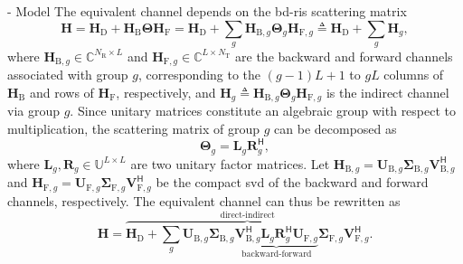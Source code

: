 \documentclass[journal]{IEEEtran}
\begin{document}
\begin{section}{- Model}
	The equivalent channel depends on the \gls{bd}-\gls{ris} scattering matrix
	\begin{equation}
		\mathbf{H} = \mathbf{H}_\mathrm{D} + \mathbf{H}_\mathrm{B} \mathbf{\Theta} \mathbf{H}_\mathrm{F} = \mathbf{H}_\mathrm{D} + \sum_g \mathbf{H}_{\mathrm{B},g} \mathbf{\Theta}_g \mathbf{H}_{\mathrm{F},g} \triangleq \mathbf{H}_\mathrm{D} + \sum_g \mathbf{H}_g,
		\label{eq:channel_equivalent}
	\end{equation}
	where $\mathbf{H}_{\mathrm{B},g} \in \mathbb{C}^{N_\mathrm{R} \times L}$ and $\mathbf{H}_{\mathrm{F},g} \in \mathbb{C}^{L \times N_\mathrm{T}}$ are the backward and forward channels associated with group $g$, corresponding to the $(g{-}1)L{+}1$ to $gL$ columns of $\mathbf{H}_\mathrm{B}$ and rows of $\mathbf{H}_\mathrm{F}$, respectively, and $\mathbf{H}_g \triangleq \mathbf{H}_{\mathrm{B},g} \mathbf{\Theta}_g \mathbf{H}_{\mathrm{F},g}$ is the indirect channel via group $g$.
	Since unitary matrices constitute an algebraic group with respect to multiplication, the scattering matrix of group $g$ can be decomposed as
	\begin{equation}
		\mathbf{\Theta}_g = \mathbf{L}_g \mathbf{R}_g^\mathsf{H},
	\end{equation}
	where $\mathbf{L}_g, \mathbf{R}_g \in \mathbb{U}^{L \times L}$ are two unitary factor matrices.
	Let $\mathbf{H}_{\mathrm{B},g} = \mathbf{U}_{\mathrm{B},g} \mathbf{\Sigma}_{\mathrm{B},g} \mathbf{V}_{\mathrm{B},g}^\mathsf{H}$ and $\mathbf{H}_{\mathrm{F},g} = \mathbf{U}_{\mathrm{F},g} \mathbf{\Sigma}_{\mathrm{F},g} \mathbf{V}_{\mathrm{F},g}^\mathsf{H}$ be the compact \gls{svd} of the backward and forward channels, respectively.
	The equivalent channel can thus be rewritten as
	\begin{equation}
		\mathbf{H} = \overbrace{\mathbf{H}_\mathrm{D} + \sum_g \mathbf{U}_{\mathrm{B},g} \mathbf{\Sigma}_{\mathrm{B},g} \underbrace{\mathbf{V}_{\mathrm{B},g}^\mathsf{H} \mathbf{L}_g \mathbf{R}_g^\mathsf{H} \mathbf{U}_{\mathrm{F},g}}_\text{backward-forward} \mathbf{\Sigma}_{\mathrm{F},g} \mathbf{V}_{\mathrm{F},g}^\mathsf{H}}^\text{direct-indirect}.
		\label{eq:channel_equivalent_svd}
	\end{equation}


\end{section}
\end{document}
